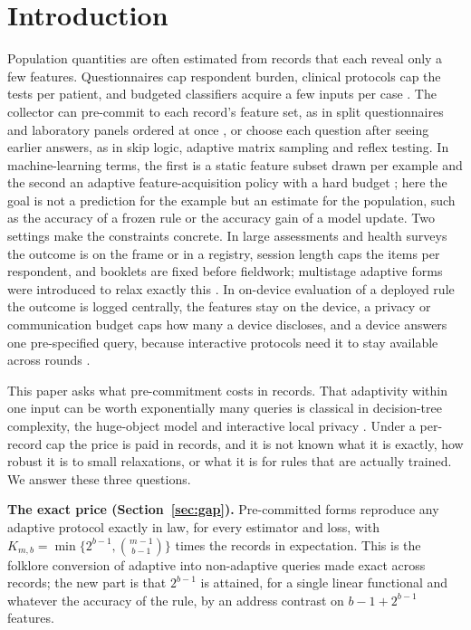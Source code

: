 \documentclass{article}
\begin{document}
\section{Introduction}
Population quantities are often estimated from records that each reveal only a few features. Questionnaires cap respondent burden, clinical protocols cap the tests per patient, and budgeted classifiers acquire a few inputs per case \citep{turney1995,trapeznikov2013,nan2017}. The collector can pre-commit to each record's feature set, as in split questionnaires and laboratory panels ordered at once \citep{raghunathan1995,chipperfield2009}, or choose each question after seeing earlier answers, as in skip logic, adaptive matrix sampling \citep{gonzalez2008} and reflex testing. In machine-learning terms, the first is a static feature subset drawn per example and the second an adaptive feature-acquisition policy with a hard budget \citep{covert2023}; here the goal is not a prediction for the example but an estimate for the population, such as the accuracy of a frozen rule or the accuracy gain of a model update. Two settings make the constraints concrete. In large assessments and health surveys the outcome is on the frame or in a registry, session length caps the items per respondent, and booklets are fixed before fieldwork; multistage adaptive forms were introduced to relax exactly this \citep{yamamoto2018}. In on-device evaluation of a deployed rule the outcome is logged centrally, the features stay on the device, a privacy or communication budget caps how many a device discloses, and a device answers one pre-specified query, because interactive protocols need it to stay available across rounds \citep{joseph2019,kairouz2021}.

This paper asks what pre-commitment costs in records. That adaptivity within one input can be worth exponentially many queries is classical in decision-tree complexity, the huge-object model and interactive local privacy \citep{goldreich2022,adar2024,joseph2019}. Under a per-record cap the price is paid in records, and it is not known what it is exactly, how robust it is to small relaxations, or what it is for rules that are actually trained. We answer these three questions.

\textbf{The exact price (Section~\ref{sec:gap}).} Pre-committed forms reproduce any adaptive protocol exactly in law, for every estimator and loss, with $K_{m,b}=\min\{2^{b-1},\binom{m-1}{b-1}\}$ times the records in expectation. This is the folklore conversion of adaptive into non-adaptive queries made exact across records; the new part is that $2^{b-1}$ is attained, for a single linear functional and whatever the accuracy of the rule, by an address contrast on $b-1+2^{b-1}$ features.
\end{document}
